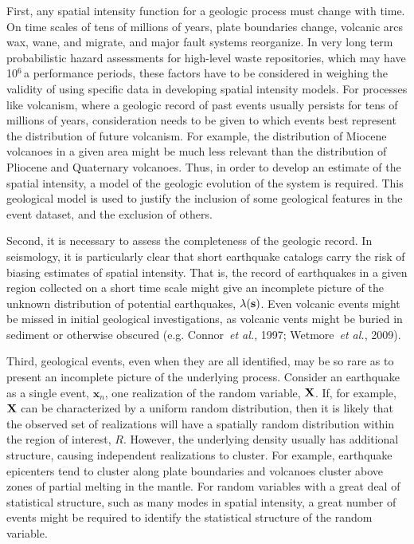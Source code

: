 \documentclass[10pt]{article}
\begin{document}
First, any spatial intensity function for a geologic process must change with time. On time scales of tens of millions of years, plate boundaries change, volcanic arcs wax, wane, and migrate, and major fault systems reorganize. In very long term probabilistic hazard assessments for high-level waste repositories, which may have 10$^6$\,a performance periods, these factors have to be considered in weighing the validity of using specific data in developing spatial intensity models. For processes like volcanism, where a geologic record of past events usually persists for tens of millions of years, consideration needs to be given to which events best represent the distribution of future volcanism. For example, the distribution of Miocene volcanoes in a given area might be much less relevant than the distribution of Pliocene and Quaternary volcanoes. Thus, in order to develop an estimate of the spatial intensity, a model of the geologic evolution of the system is required. This geological model is used to justify the inclusion of some geological features in the event dataset, and the exclusion of others.

Second, it is necessary to assess the completeness of the geologic record. In seismology, it is particularly clear that short earthquake catalogs carry the risk of biasing estimates of spatial intensity. That is, the record of earthquakes in a given region collected on a short time scale might give an incomplete picture of the unknown distribution of potential earthquakes, $\lambda(\bf{s})$. Even volcanic events might be missed in initial geological investigations, as volcanic vents might be buried in sediment or otherwise obscured (e.g. Connor~{\it et al.}, 1997; Wetmore~{\it et al.}, 2009).

Third, geological events, even when they are all identified, may be so rare as to present an incomplete picture of the underlying process. Consider an earthquake as a single event, $\mathbf{x}_n$, one realization of the random variable, $\bf{X}$. If, for example, $\bf{X}$ can be characterized by a uniform random distribution, then it is likely that the observed set of realizations will have a spatially random distribution within the region of interest, $R$. However, the underlying density usually has additional structure, causing independent realizations to cluster. For example, earthquake epicenters tend to cluster along plate boundaries and volcanoes cluster above zones of partial melting in the mantle. For random variables with a great deal of statistical structure, such as many modes in spatial intensity, a great number of events might be required to identify the statistical structure of the random variable.
\end{document}
